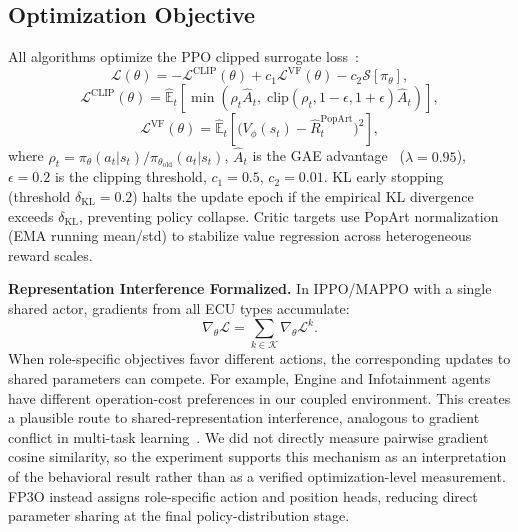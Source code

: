 \documentclass[conference]{IEEEtran}
\begin{document}
\subsection{Optimization Objective}

All algorithms optimize the PPO clipped surrogate loss~\cite{schulman2017ppo}:
\begin{equation}
  \mathcal{L}(\theta) = -\mathcal{L}^{\text{CLIP}}(\theta)
    + c_1 \mathcal{L}^{\text{VF}}(\theta) - c_2 \mathcal{S}[\pi_\theta],
  \label{eq:loss}
\end{equation}
\begin{equation}
  \mathcal{L}^{\text{CLIP}}(\theta) = \hat{\mathbb{E}}_t\!\left[
    \min\!\left(\rho_t\hat{A}_t,\;\mathrm{clip}(\rho_t, 1\!-\!\epsilon, 1\!+\!\epsilon)\hat{A}_t\right)\right],
\end{equation}
\begin{equation}
  \mathcal{L}^{\text{VF}}(\theta) = \hat{\mathbb{E}}_t\!\left[
    \bigl(V_\phi(s_t) - \hat{R}_t^{\text{PopArt}}\bigr)^2\right],
\end{equation}
where $\rho_t = \pi_\theta(a_t|s_t)/\pi_{\theta_{\mathrm{old}}}(a_t|s_t)$,
$\hat{A}_t$ is the GAE advantage~\cite{schulman2015trpo} ($\lambda=0.95$),
$\epsilon=0.2$ is the clipping threshold, $c_1=0.5$, $c_2=0.01$.
KL early stopping~\cite{schulman2017ppo} (threshold $\delta_{\text{KL}}=0.2$) halts
the update epoch if the empirical KL divergence exceeds $\delta_{\text{KL}}$, preventing
policy collapse. Critic targets use PopArt normalization~\cite{vanhasselt2016popart}
(EMA running mean/std) to stabilize value regression across heterogeneous reward scales.

\textbf{Representation Interference Formalized.}
In IPPO/MAPPO with a single shared actor, gradients from all ECU types accumulate:
\[
  \nabla_\theta \mathcal{L} =
    \sum_{k \in \mathcal{K}} \nabla_\theta \mathcal{L}^k.
\]
When role-specific objectives favor different actions, the corresponding updates to
shared parameters can compete. For example, Engine and Infotainment agents have different
operation-cost preferences in our coupled environment. This creates a plausible route to
shared-representation interference, analogous to gradient conflict in multi-task learning~\cite{yu2020pcgrad}.
We did not directly measure pairwise gradient cosine similarity, so the experiment supports
this mechanism as an interpretation of the behavioral result rather than as a verified
optimization-level measurement. FP3O instead assigns role-specific action and position
heads, reducing direct parameter sharing at the final policy-distribution stage.
\end{document}

